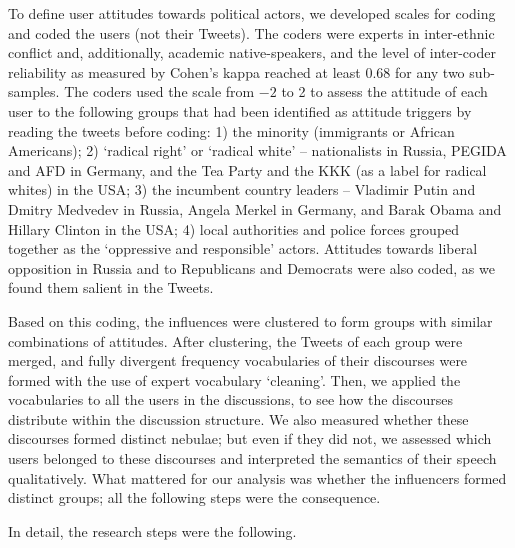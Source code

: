 To define user attitudes towards political actors, we developed scales for coding and coded the users (not their Tweets). The coders were experts in inter-ethnic conflict and, additionally, academic native-speakers, and the level of inter-coder reliability as measured by Cohen’s kappa reached at least 0.68 for any two sub-samples. The coders used the scale from \(-2\) to 2 to assess the attitude of each user to the following groups that had been identified as attitude triggers by reading the tweets before coding: 1) the minority (immigrants or African Americans); 2) ‘radical right’ or ‘radical white’ -- nationalists in Russia, PEGIDA and AFD in Germany, and the Tea Party and the KKK (as a label for radical whites) in the USA; 3) the incumbent country leaders -- Vladimir Putin and Dmitry Medvedev in Russia, Angela Merkel in Germany, and Barak Obama and Hillary Clinton in the USA; 4) local authorities and police forces grouped together as the ‘oppressive and responsible’ actors. Attitudes towards liberal opposition in Russia and to Republicans and Democrats were also coded, as we found them salient in the Tweets.

Based on this coding, the influences were clustered to form groups with similar combinations of attitudes. After clustering, the Tweets of each group were merged, and fully divergent frequency vocabularies of their discourses were formed with the use of expert vocabulary ‘cleaning’. Then, we applied the vocabularies to all the users in the discussions, to see how the discourses distribute within the discussion structure. We also measured whether these discourses formed distinct nebulae; but even if they did not, we assessed which users belonged to these discourses and interpreted the semantics of their speech qualitatively. What mattered for our analysis was whether the influencers formed distinct groups; all the following steps were the consequence.

In detail, the research steps were the following.

